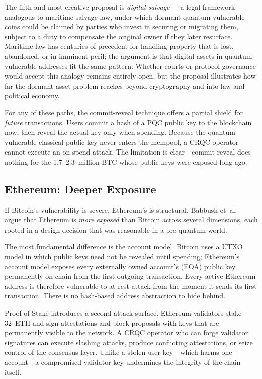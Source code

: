 The fifth and most creative proposal is \emph{digital salvage}~\cite{BabbushZalcmanGidney2026}---a legal framework analogous to maritime salvage law, under which dormant quantum-vulnerable coins could be claimed by parties who invest in securing or migrating them, subject to a duty to compensate the original owner if they later resurface.  Maritime law has centuries of precedent for handling property that is lost, abandoned, or in imminent peril; the argument is that digital assets in quantum-vulnerable addresses fit the same pattern.  Whether courts or protocol governance would accept this analogy remains entirely open, but the proposal illustrates how far the dormant-asset problem reaches beyond cryptography and into law and political economy.

For any of these paths, the commit-reveal technique offers a partial shield for \emph{future} transactions.  Users commit a hash of a PQC public key to the blockchain now, then reveal the actual key only when spending.  Because the quantum-vulnerable classical public key never enters the mempool, a CRQC operator cannot execute an on-spend attack.  The limitation is clear---commit-reveal does nothing for the 1.7--2.3~million BTC whose public keys were exposed long ago.

\subsection{Ethereum: Deeper Exposure}
\label{subsec:ethereum-exposure}

If Bitcoin's vulnerability is severe, Ethereum's is structural.  Babbush et~al.~\cite{BabbushZalcmanGidney2026} argue that Ethereum is \emph{more exposed} than Bitcoin across several dimensions, each rooted in a design decision that was reasonable in a pre-quantum world.

The most fundamental difference is the account model.  Bitcoin uses a UTXO model in which public keys need not be revealed until spending; Ethereum's account model exposes every externally owned account's (EOA) public key permanently on-chain from the first outgoing transaction.  Every active Ethereum address is therefore vulnerable to at-rest attack from the moment it sends its first transaction.  There is no hash-based address abstraction to hide behind.

Proof-of-Stake introduces a second attack surface.  Ethereum validators stake 32~ETH and sign attestations and block proposals with keys that are permanently visible to the network.  A CRQC operator who can forge validator signatures can execute slashing attacks, produce conflicting attestations, or seize control of the consensus layer.  Unlike a stolen user key---which harms one account---a compromised validator key undermines the integrity of the chain itself.

